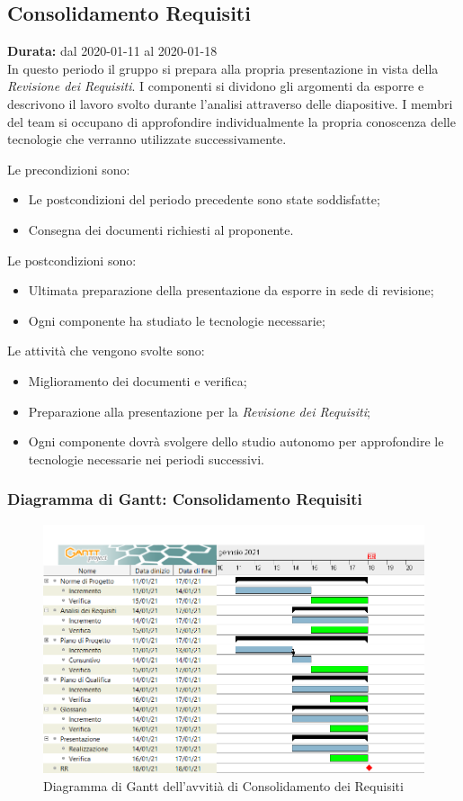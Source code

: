 \subsection{Consolidamento Requisiti}
\label{consolidamento_requisiti}
\textbf{Durata:} dal 2020-01-11 al 2020-01-18 \\
In questo periodo il gruppo si prepara alla propria presentazione in vista della \textit{Revisione dei Requisiti}.
I componenti si dividono gli argomenti da esporre e descrivono il lavoro svolto durante l'analisi attraverso delle diapositive.
I membri del team si occupano di approfondire individualmente la propria conoscenza delle tecnologie che verranno utilizzate successivamente.

Le precondizioni sono:
\begin{itemize}
    \item Le postcondizioni del periodo precedente sono state soddisfatte;
    \item Consegna dei documenti richiesti al proponente.
\end{itemize}

Le postcondizioni sono:
\begin{itemize}
    \item Ultimata preparazione della presentazione da esporre in sede di revisione;
    \item Ogni componente ha studiato le tecnologie necessarie;
\end{itemize}
Le attività che vengono svolte sono:
\begin{itemize}
    \item Miglioramento dei documenti e verifica;
    \item Preparazione alla presentazione per la \textit{Revisione dei Requisiti};
    \item Ogni componente dovrà svolgere dello studio autonomo per approfondire le tecnologie necessarie nei periodi successivi.  
\end{itemize}

\newpage
\subsubsection{Diagramma di Gantt: Consolidamento Requisiti}
\begin{figure}[ht]
    \centering
    \includegraphics[width=\textwidth]{../../Immagini/GanttConsolidamentoRequisiti}
    \caption{Diagramma di Gantt dell'avvitià di Consolidamento dei Requisiti}
\end{figure}
